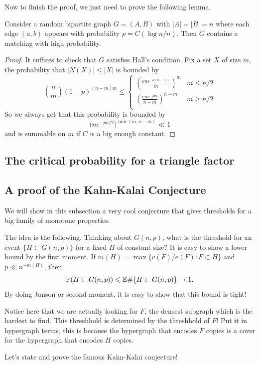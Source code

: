 Now to finish the proof, we just need to prove the following lemma,
\begin{lemma}
	Consider a random bipartite graph $G = (A,B)$ with $|A| = |B| = n$
	where each edge $(a,b)$ appears
	with probability $p = C(\log n/n)$. Then $G$ contains a matching
	with high probability.
\end{lemma}
\begin{proof}
	It suffices to check that $G$ satisfies Hall's condition. Fix a set
	$X$ of size $m$,
	the probability that $|N(X)| \leq |X|$ is bounded by
	\[
		\binom{n}{m} (1-p)^{(n-m)m} \leq
		\begin{cases}
			(\frac{en e^{-p(n-m)}}{m})^{m} & m \leq n/2\\
			(\frac{en e^{-pm}}{n - m})^{n - m} & m \geq n/2\\
		\end{cases}
	\]
	So we always get that this probability is bounded by
	\[
		\bigg(ne^{-pn/2}\bigg)^{\min(m, n-m)} \ll 1
	\]
	and is summable on $m$ if $C$ is a big enough constant.
\end{proof}

\subsection{The critical probability for a triangle factor}


\subsection{A proof of the Kahn-Kalai Conjecture}
We will show in this subsection a very cool conjecture that
gives thresholds for a big family of monotone properties.

The idea is the following. Thinking about $G(n,p)$, what is the threshold for
an event $\{H \subset G(n,p)\}$ for a fixed $H$ of constant size? It
is easy to show
a lower bound by the first moment. If $m(H) = \max\{v(F)/e(F) : F \subset H\}$
and $p \ll n^{-m(H)}$, then
\[\mathbb{P}(H \subset G(n,p)) \leqslant \mathbb{E}\# \{ H \subset G(n,p)\} \rightarrow 1.\]
By doing Janson or second moment, it is easy to show that this bound is tight!

Notice here that we are actually looking for $F$, the densest subgraph
which is the hardest to find. This threshhold is determined by the
threshhold of $F$!
Put it in hypergraph terms, this is because the hypergraph that
encodes $F$ copies is
a cover for the hypergraph that encodes $H$ copies.

Let's state and prove the famous Kahn-Kalai conjecture!

